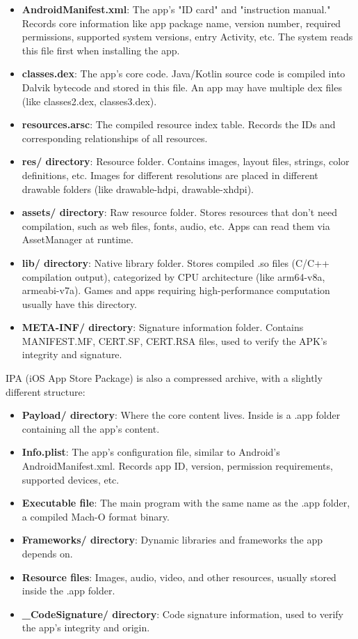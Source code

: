 \begin{itemize}
  \item \textbf{AndroidManifest.xml}: The app's "ID card" and "instruction manual." Records core information like app package name, version number, required permissions, supported system versions, entry Activity, etc. The system reads this file first when installing the app.
  \item \textbf{classes.dex}: The app's core code. Java/Kotlin source code is compiled into Dalvik bytecode and stored in this file. An app may have multiple dex files (like classes2.dex, classes3.dex).
  \item \textbf{resources.arsc}: The compiled resource index table. Records the IDs and corresponding relationships of all resources.
  \item \textbf{res/ directory}: Resource folder. Contains images, layout files, strings, color definitions, etc. Images for different resolutions are placed in different drawable folders (like drawable-hdpi, drawable-xhdpi).
  \item \textbf{assets/ directory}: Raw resource folder. Stores resources that don't need compilation, such as web files, fonts, audio, etc. Apps can read them via AssetManager at runtime.
  \item \textbf{lib/ directory}: Native library folder. Stores compiled .so files (C/C++ compilation output), categorized by CPU architecture (like arm64-v8a, armeabi-v7a). Games and apps requiring high-performance computation usually have this directory.
  \item \textbf{META-INF/ directory}: Signature information folder. Contains MANIFEST.MF, CERT.SF, CERT.RSA files, used to verify the APK's integrity and signature.
\end{itemize}


IPA (iOS App Store Package) is also a compressed archive, with a slightly different structure:

\begin{itemize}
  \item \textbf{Payload/ directory}: Where the core content lives. Inside is a .app folder containing all the app's content.
  \item \textbf{Info.plist}: The app's configuration file, similar to Android's AndroidManifest.xml. Records app ID, version, permission requirements, supported devices, etc.
  \item \textbf{Executable file}: The main program with the same name as the .app folder, a compiled Mach-O format binary.
  \item \textbf{Frameworks/ directory}: Dynamic libraries and frameworks the app depends on.
  \item \textbf{Resource files}: Images, audio, video, and other resources, usually stored inside the .app folder.
  \item \textbf{\_CodeSignature/ directory}: Code signature information, used to verify the app's integrity and origin.
\end{itemize}

